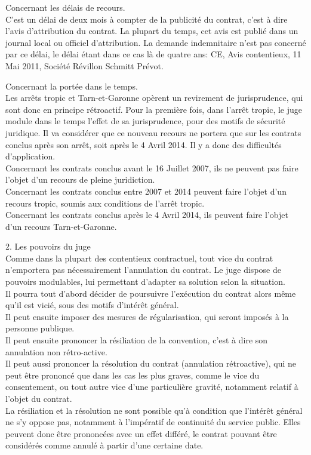 \documentclass[10pt, a4paper, openany]{book}
\begin{document}
Concernant les délais de recours. \\
C'est un délai de deux mois à compter de la publicité du contrat, c'est à dire l'avis d'attribution du contrat. La plupart du temps, cet avis est publié dans un journal local ou officiel d'attribution. La demande indemnitaire n'est pas concerné par ce délai, le délai étant dans ce cas là de quatre ans: CE, Avis contentieux, 11 Mai 2011, Société Révillon Schmitt Prévot. 


Concernant la portée dans le temps. \\
Les arrêts tropic et Tarn-et-Garonne opèrent un revirement de jurisprudence, qui sont donc en principe rétroactif. Pour la première fois, dans l'arrêt tropic, le juge module dans le temps l'effet de sa jurisprudence, pour des motifs de sécurité juridique. Il va considérer que ce nouveau recours ne portera que sur les contrats conclus après son arrêt, soit après le 4 Avril 2014. Il y a donc des difficultés d'application. \\
Concernant les contrats conclus avant le 16 Juillet 2007, ils ne peuvent pas faire l'objet d'un recours de pleine juridiction. \\
Concernant les contrats conclus entre 2007 et 2014 peuvent faire l'objet d'un recours tropic, soumis aux conditions de l'arrêt tropic. \\
Concernant les contrats conclus après le 4 Avril 2014, ils peuvent faire l'objet d'un recours Tarn-et-Garonne. 


2. Les pouvoirs du juge \\
Comme dans la plupart des contentieux contractuel, tout vice du contrat n'emportera pas nécessairement l'annulation du contrat. Le juge dispose de pouvoirs modulables, lui permettant d'adapter sa solution selon la situation. \\
Il pourra tout d'abord décider de poursuivre l'exécution du contrat alors même qu'il est vicié, sous des motifs d'intérêt général. \\
Il peut ensuite imposer des mesures de régularisation, qui seront imposés à la personne publique. \\
Il peut ensuite prononcer la résiliation de la convention, c'est à dire son annulation non rétro-active. \\
Il peut aussi prononcer la résolution du contrat (annulation rétroactive), qui ne peut être prononcé que dans les cas les plus graves, comme le vice du consentement, ou tout autre vice d'une particulière gravité, notamment relatif à l'objet du contrat. \\
La résiliation et la résolution ne sont possible qu'à condition que l'intérêt général ne s'y oppose pas, notamment à l'impératif de continuité du service public. Elles peuvent donc être prononcées avec un effet différé, le contrat pouvant être considérés comme annulé à partir d'une certaine date.
\end{document}
